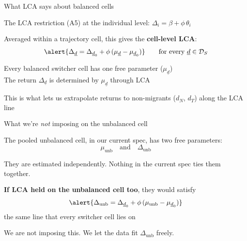 \documentclass[10pt,aspectratio=169]{beamer}
\newcommand{\mud}{\mu_{\underline{d}}}
\newcommand{\mudz}{\mu_{\underline{d}_0}}
\newcommand{\munb}{\mu_{\mathrm{unb}}}
\newcommand{\Deltad}{\Delta_{\underline{d}}}
\newcommand{\Deltadz}{\Delta_{\underline{d}_0}}
\newcommand{\Deltaunb}{\Delta_{\mathrm{unb}}}
\newcommand{\DS}{\mathcal{D}_{S}}
\newcommand{\dN}{d_{N}}
\newcommand{\dT}{d_{T}}
\begin{document}
\begin{frame}{What LCA says about balanced cells}

  The LCA restriction (A5) at the individual level: $\Delta_i = \beta + \phi\, \theta_i$

  \vspace{0.8em}
  Averaged within a trajectory cell, this gives the \textbf{cell-level LCA}:
  \[
    \alert{\Deltad = \Deltadz + \phi\, (\mud - \mudz)} \qquad \text{for every } \underline d \in \DS
  \]

  \vspace{0.6em}
  Every balanced switcher cell has one free parameter ($\mud$)\\
  The return $\Deltad$ is determined by $\mud$ through LCA

  \vspace{0.8em}
  This is what lets us extrapolate returns to non-migrants ($\dN$, $\dT$) along the LCA line

\end{frame}

\begin{frame}{What we're \emph{not} imposing on the unbalanced cell}

  The pooled unbalanced cell, in our current spec, has \alert{two} free parameters:
  \[
    \munb \quad \text{and} \quad \Deltaunb
  \]

  They are estimated independently. Nothing in the current spec ties them together.

  \vspace{1em}
  \textbf{If LCA held on the unbalanced cell too}, they would satisfy
  \[
    \alert{\Deltaunb = \Deltadz + \phi\,(\munb - \mudz)}
  \]
  the same line that every switcher cell lies on

  \vspace{0.6em}
  We are not imposing this. We let the data fit $\Deltaunb$ freely.

\end{frame}
\end{document}
